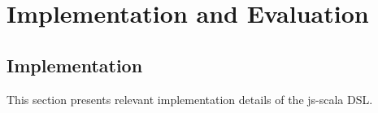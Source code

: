 \documentclass[american,english,runningheads]{llncs}
\newcommand{\eg}{\emph{e.g.}}
\begin{document}
% 
% 
% 
% 
% 
% 

\section{Implementation and Evaluation}
\label{validation}

\subsection{Implementation}
\label{implementation}

This section presents relevant implementation details of the js-scala DSL.
\end{document}
